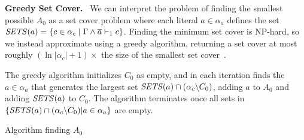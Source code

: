 %


\noindent \textbf{Greedy Set Cover.}~\label{subsec:sym} %
We can interpret the problem of finding the smallest possible $A_0$ as a set cover problem 
where each literal $a \in \alpha_a$ defines the set  ${\it SETS}(a) = \{ c \in \alpha_c \; | \; \Gamma \land \overline{a} \vdash_1 c\}$.
Finding the minimum set cover is NP-hard, so we instead approximate using a greedy algorithm, returning a set cover at most roughly $(\ln |\alpha_c| + 1)\times$ the size of the smallest set cover~\cite{greedysetcover}. 




The greedy algorithm initializes $C_0$ as empty, and in each iteration finds the $a \in \alpha_a$ that generates the largest set ${\it SETS}(a) \cap (\alpha_c \backslash C_0)$, adding $a$ to $A_0$ and adding ${\it SETS}(a)$ to $C_0$.
The algorithm terminates once all sets in $\{{\it SETS}(a) \cap (\alpha_c \backslash C_0) | a \in \alpha_a \}$ are empty.


\begin{algorithm}
    \caption{Algorithm finding $A_0$}\label{alg:finda0}
    \SetAlgoNoLine
\end{algorithm}

